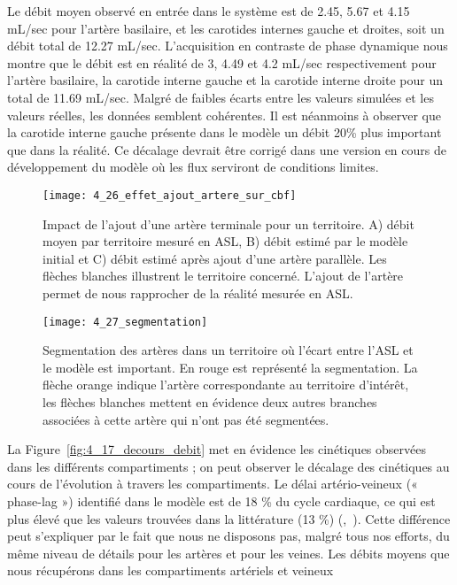 Le débit moyen observé en entrée dans le système est de 2.45, 5.67 et 4.15 mL/sec pour
l’artère basilaire, et les carotides internes gauche et droites, soit un débit total de 12.27 mL/sec.
L’acquisition en contraste de phase dynamique nous montre que le débit est en réalité de 3, 4.49 et
4.2 mL/sec respectivement pour l’artère basilaire, la carotide interne gauche et la carotide interne
droite pour un total de 11.69 mL/sec. Malgré de faibles écarts entre les valeurs simulées et les valeurs
réelles, les données semblent cohérentes. Il est néanmoins à observer que la carotide interne gauche
présente dans le modèle un débit 20\% plus important que dans la réalité. Ce décalage devrait être
corrigé dans une version en cours de développement du modèle où les flux serviront de conditions
limites.\\
\begin{figure}[!t]
\centering
\texttt{[image: 4\_26\_effet\_ajout\_artere\_sur\_cbf]}
\caption{Impact de l'ajout d'une artère terminale pour un territoire. A) débit moyen par territoire mesuré en ASL, B) débit estimé par le modèle initial et C) débit estimé après ajout d'une artère parallèle. Les flèches blanches illustrent le territoire concerné. L'ajout de l'artère permet de nous rapprocher de la réalité mesurée en ASL.}
\label{fig:4_26_effet_ajout_artere_sur_cbf}	
\end{figure}
\begin{figure}[!t]
\centering
\texttt{[image: 4\_27\_segmentation]}
\caption{Segmentation des artères dans un territoire où l'écart entre l'ASL et le modèle est important. En rouge est représenté la segmentation. La flèche orange indique l'artère correspondante au territoire d'intérêt, les flèches blanches mettent en évidence deux autres branches associées à cette artère qui n'ont pas été segmentées.}
\label{fig:4_27_segmentation}	
\end{figure}
La Figure~\ref{fig:4_17_decours_debit} met en évidence les cinétiques observées dans les différents compartiments ; on
peut observer le décalage des cinétiques au cours de l’évolution à travers les compartiments. Le délai
artério-veineux (« phase-lag ») identifié dans le modèle est de 18 \% du cycle cardiaque, ce qui est plus
élevé que les valeurs trouvées dans la littérature (13 \%) (\cite{Linninger2009},~\cite{Kim2007}). Cette différence peut s’expliquer par
le fait que nous ne disposons pas, malgré tous nos efforts, du même niveau de détails pour les artères
et pour les veines. Les débits moyens que nous récupérons dans les compartiments artériels et veineux
